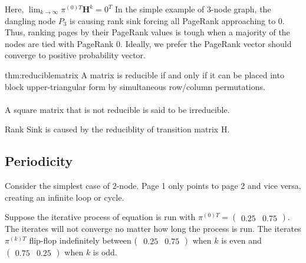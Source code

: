\noindent Here, $\displaystyle \lim_{k\to \infty}{\pi}^{(0)T}\mathbf{H}^k = 0^T$
In the simple example of 3-node graph, the dangling node $P_3$ is causing rank sink forcing all PageRank approaching to 0. Thus, ranking pages by their PageRank values is tough when a majority of the nodes are tied with PageRank 0. Ideally, we prefer the PageRank vector should converge to positive probability vector.\\

\begin{thm}{thm:reduciblematrix}
	A matrix is reducible if and only if it can be placed into block upper-triangular form by simultaneous row/column permutations.\\
	\\A square matrix that is not reducible is said to be irreducible.
\end{thm}

\noindent Rank Sink is caused by the reduciblity of transition matrix H.

\subsection{Periodicity}
\noindent Consider the simplest case of 2-node. Page 1 only points to page 2 and vice versa, creating an infinite loop or cycle.
\begin{center}
\end{center}
	
\noindent Suppose the iterative process of equation is run with $\pi^{(0) T}=\left(\begin{array}{ll}0.25 & 0.75\end{array}\right)$. The iterates will not converge no matter how long the process is run. The iterates ${\pi}^{(k) T}$ flip-flop indefinitely between ( $\left.\begin{array}{ll}0.25 & 0.75\end{array}\right)$ when $k$ is even and $\left(\begin{array}{ll}0.75 & 0.25\end{array}\right)$ when $k$ is odd.\\

